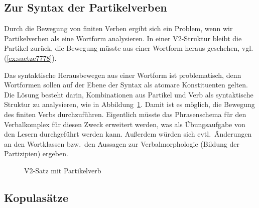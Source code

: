 \subsection{Zur Syntax der Partikelverben}

\label{sec:partikelverben}

Durch die Bewegung von finiten Verben ergibt sich ein Problem, wenn wir Partikelverben als eine Wortform analysieren.
In einer V2-Struktur bleibt die Partikel zurück, die Bewegung müsste aus einer Wortform heraus geschehen, vgl. (\ref{ex:saetze7778}).

\begin{exe}
\end{exe}


Das syntaktische Herausbewegen aus einer Wortform ist problematisch, denn Wortformen sollen auf der Ebene der Syntax als atomare Konstituenten gelten.
Die Lösung besteht darin, Kombinationen aus Partikel und Verb als syntaktische Struktur zu analysieren, wie in Abbildung~\ref{fig:v2mitpartikel}.
Damit ist es möglich, die Bewegung des finiten Verbs durchzuführen.
Eigentlich müsste das Phrasenschema für den Verbalkomplex für diesen Zweck erweitert werden, was als Übungsaufgabe von den Lesern durchgeführt werden kann.
Außerdem würden sich evtl.\ Änderungen an den Wortklassen bzw.\ den Aussagen zur Verbalmorphologie (\zB Bildung der Partizipien) ergeben.

\begin{figure}[!h]
  \centering
  \vspace{0.3cm}
  \caption{V2-Satz mit Partikelverb}
  \label{fig:v2mitpartikel}
\end{figure}

\subsection{Kopulasätze}

